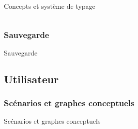 \documentclass[8pt]{beamer}
\begin{document}
\begin{frame}{Concepts et système de typage}
\begin{columns}
\begin{column}{6cm}
\end{column}

\end{columns}
\end{frame}





\subsubsection{Sauvegarde}
\begin{frame}{Sauvegarde}
\end{frame}


\subsection{Utilisateur}

\subsubsection{Scénarios et graphes conceptuels}
\begin{frame}{Scénarios et graphes conceptuels}
\end{frame}
\end{document}
